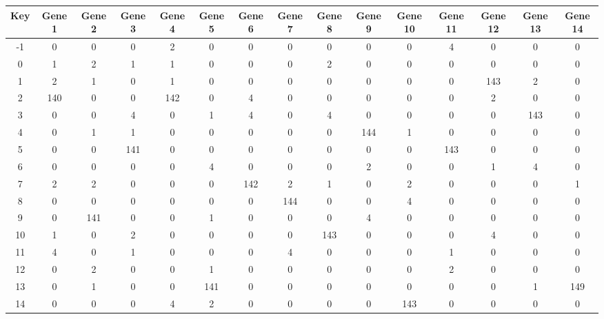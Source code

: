 \begin{tabular}{|c|c|c|c|c|c|c|c|c|c|c|c|c|c|c|}
\hline
Key & Gene 1 & Gene 2 & Gene 3 & Gene 4 & Gene 5 & Gene 6 & Gene 7 & Gene 8 & Gene 9 & Gene 10 & Gene 11 & Gene 12 & Gene 13 & Gene 14 \\
\hline
-1 & 0 & 0 & 0 & 2 & 0 & 0 & 0 & 0 & 0 & 0 & 4 & 0 & 0 & 0 \\
0 & 1 & 2 & 1 & 1 & 0 & 0 & 0 & 2 & 0 & 0 & 0 & 0 & 0 & 0 \\
1 & 2 & 1 & 0 & 1 & 0 & 0 & 0 & 0 & 0 & 0 & 0 & 143 & 2 & 0 \\
2 & 140 & 0 & 0 & 142 & 0 & 4 & 0 & 0 & 0 & 0 & 0 & 2 & 0 & 0 \\
3 & 0 & 0 & 4 & 0 & 1 & 4 & 0 & 4 & 0 & 0 & 0 & 0 & 143 & 0 \\
4 & 0 & 1 & 1 & 0 & 0 & 0 & 0 & 0 & 144 & 1 & 0 & 0 & 0 & 0 \\
5 & 0 & 0 & 141 & 0 & 0 & 0 & 0 & 0 & 0 & 0 & 143 & 0 & 0 & 0 \\
6 & 0 & 0 & 0 & 0 & 4 & 0 & 0 & 0 & 2 & 0 & 0 & 1 & 4 & 0 \\
7 & 2 & 2 & 0 & 0 & 0 & 142 & 2 & 1 & 0 & 2 & 0 & 0 & 0 & 1 \\
8 & 0 & 0 & 0 & 0 & 0 & 0 & 144 & 0 & 0 & 4 & 0 & 0 & 0 & 0 \\
9 & 0 & 141 & 0 & 0 & 1 & 0 & 0 & 0 & 4 & 0 & 0 & 0 & 0 & 0 \\
10 & 1 & 0 & 2 & 0 & 0 & 0 & 0 & 143 & 0 & 0 & 0 & 4 & 0 & 0 \\
11 & 4 & 0 & 1 & 0 & 0 & 0 & 4 & 0 & 0 & 0 & 1 & 0 & 0 & 0 \\
12 & 0 & 2 & 0 & 0 & 1 & 0 & 0 & 0 & 0 & 0 & 2 & 0 & 0 & 0 \\
13 & 0 & 1 & 0 & 0 & 141 & 0 & 0 & 0 & 0 & 0 & 0 & 0 & 1 & 149 \\
14 & 0 & 0 & 0 & 4 & 2 & 0 & 0 & 0 & 0 & 143 & 0 & 0 & 0 & 0 \\
\hline
\end{tabular}